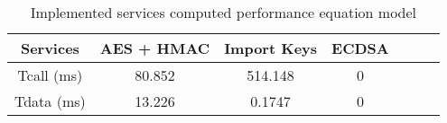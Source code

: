 \begin{table}[]
\centering
\def\arraystretch{1.5}
\begin{tabular}{|c|c|c|c|c|c|c|}
\hline
Services   & AES + HMAC    & Import Keys & ECDSA   \\ \hline
Tcall (ms) & 80.852 & 514.148  & 0 \\ \hline
Tdata (ms) & 13.226 & 0.1747 & 0 \\ \hline
\end{tabular}
\caption{Implemented services computed performance equation model}
\label{tab:services-model}
\end{table}
